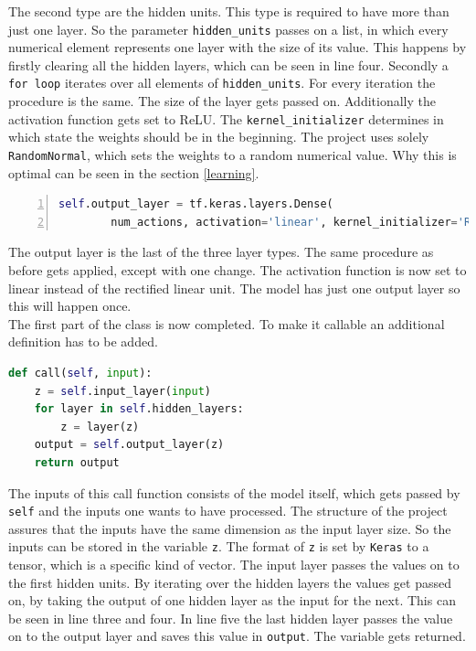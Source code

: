 \documentclass[12pt]{article}
\begin{document}
The second type are the \gls{hidden units}. This type is required to have more than just one layer. So the parameter \lstinline{hidden_units} passes on a list, in which every numerical element represents one layer with the size of its value. This happens by firstly clearing all the \glspl{hidden layer}, which can be seen in line four. Secondly a \lstinline{for loop} iterates over all elements of \lstinline{hidden_units}. For every iteration the procedure is the same. The size of the layer gets passed on. Additionally the \gls{activation function} gets set to ReLU. The \lstinline{kernel_initializer} determines in which \gls{state} the \glspl{weight} should be in the beginning. The project uses solely \lstinline{RandomNormal}, which sets the \glspl{weight} to a random numerical value. Why this is optimal can be seen in the section \ref{learning}.
\lstset{ numbers=left, stepnumber=1,      firstnumber=8,  numberfirstline=true}
\begin{lstlisting}[language=Python,numbers=left]
    self.output_layer = tf.keras.layers.Dense(
        num_actions, activation='linear', kernel_initializer='RandomNormal')
\end{lstlisting}
The \gls{output layer} is the last of the three layer types. The same procedure as before gets applied, except with one change. The \gls{activation function} is now set to linear instead of the rectified linear unit. The model has just one \gls{output layer} so this will happen once.
\lstset{ numbers=left, stepnumber=1,firstnumber=1,  numberfirstline=true}
\\ The first part of the class is now completed. To make it callable an additional definition has to be added.
\begin{lstlisting}[language=Python, caption = Example - Making the model callable]
def call(self, input):
    z = self.input_layer(input) 
    for layer in self.hidden_layers: 
        z = layer(z) 
    output = self.output_layer(z) 
    return output
\end{lstlisting}
The  \glspl{input} of this call function consists of the model itself, which gets passed by \lstinline{self} and the  \glspl{input} one wants to have processed. The structure of the project assures that the  \glspl{input} have the same dimension as the \gls{input layer} size. So the  \glspl{input} can be stored in the variable \lstinline{z}. The format of \lstinline{z} is set by \lstinline{Keras} to a \gls{tensor}, which is a specific kind of \gls{vector}. The \gls{input layer} passes the values on to the first \gls{hidden units}. By iterating over the \glspl{hidden layer} the values get passed on, by taking the \gls{output} of one hidden layer as the \gls{input} for the next. This can be seen in line three and four. In line five the last hidden layer passes the value on to the  \gls{output layer} and saves this value in \lstinline{output}. The variable gets returned.
\end{document}

